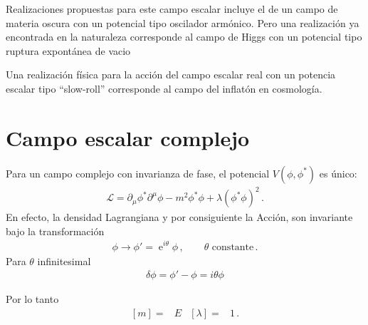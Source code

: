 Realizaciones propuestas para este campo escalar incluye el de un campo de materia oscura con un potencial tipo oscilador armónico.
Pero una realización ya encontrada en la naturaleza corresponde al campo de Higgs con un potencial tipo ruptura expontánea de vacio

Una realización física para la acción del campo escalar real con un potencia escalar tipo ``slow-roll''  corresponde al campo del inflatón en cosmología.

\section{Campo escalar complejo}


Para un campo complejo con invarianza de fase, el potencial $V(\phi,\phi^{*})$ es único:
\begin{align}
\label{eq:cef}
  \mathcal{L}=\partial_{\mu}\phi^{*} \partial^{\mu}\phi-m^2\phi^{*}\phi+\lambda \left(\phi^{*}\phi \right)^2\,.
\end{align}
En efecto, la densidad Lagrangiana y por consiguiente la Acción, son invariante bajo la transformación
\begin{align}
  \phi\to \phi'=\operatorname{e}^{i\theta}\phi\,,\qquad \text{$\theta$ constante}\,.
\end{align}
Para $\theta$ infinitesimal
\begin{align}
\label{eq:deltaphi}
  \delta\phi=\phi'-\phi=i\theta\phi
\end{align}



Por lo tanto
\begin{align}
  \left[ m \right]=&E& \left[ \lambda \right]=&1\,.
\end{align}


